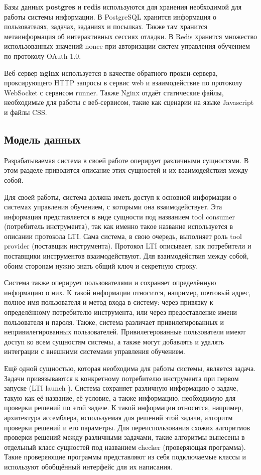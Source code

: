 \documentclass[a4paper,article,14pt]{extarticle}
\begin{document}
Базы данных \textbf{postgres} и \textbf{redis} используются для хранения необходимой для работы системы информации. В PostgreSQL\cite{postgresql} хранится информация о пользователях, задачах, заданиях и посылках. Также там хранится метаинформация об интерактивных сессиях отладки. В Redis\cite{redis} хранится множество использованных значений nonce при авторизации систем управления обучением по протоколу OAuth 1.0.

Веб-сервер \textbf{nginx} используется в качестве обратного прокси-сервера, проксирующего HTTP запросы в сервис web и взаимодействие по протоколу WebSocket с сервисом runner. Также Nginx отдаёт статические файлы, необходимые для работы с веб-сервисом, такие как сценарии на языке Javascript и файлы CSS.

\subsection{Модель данных}

Разрабатываемая система в своей работе оперирует различными сущностями. В этом разделе приводится описание этих сущностей и их взаимодействия между собой.

Для своей работы, система должна иметь доступ к основной информации о системах управления обучением, с которыми она взаимодействует. Эта информация представляется в виде сущности под названием tool consumer (потребитель инструмента), так как именно такое название используется в описании протокола LTI\cite{lti}. Сама система, в свою очередь, выполняет роль tool provider (поставщик инструмента). Протокол LTI описывает, как потребители и поставщики инструментов взаимодействуют. Для взаимодействия между собой, обоим сторонам нужно знать общий ключ и секретную строку.

Система также оперирует пользователями и сохраняет определённую информацию о них. К такой информации относится, например, почтовый адрес, полное имя пользователя и метод входа в систему: через привязку к определённому потребителю инструмента, или через предоставление имени пользователя и пароля. Также, система различает привилегированных и непривилегированных пользователей. Привилегерованные пользователи имеют доступ ко всем сущностям системы, а также могут добавлять и удалять интеграции с внешними системами управления обучением.

Ещё одной сущностью, которая необходима для работы системы, является задача. Задачи привязываются к конкретному потребителю инструмента при первом запуске (LTI launch \cite{lti}). Система сохраняет различную информацию о задаче, такую как её название, её условие, а также информацию, необходимую для проверки решений по этой задаче. К такой информации относится, например, архитектура ассемблера, используемая для решений этой задачи, алгоритм проверки решений и его параметры. Для переиспользования схожих алгоритмов проверки решений между различными задачами, такие алгоритмы вынесены в отдельный класс сущностей под названием checker (проверяющая программа). Такие проверяющие программы представляют из себя подключаемые классы и используют обобщённый интерфейс для их написания.
\end{document}
